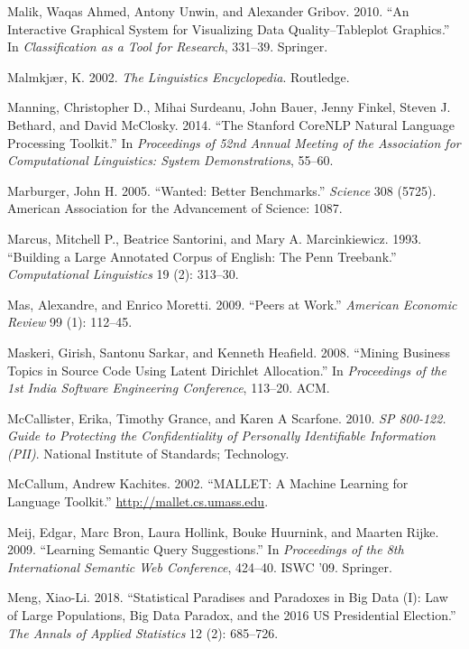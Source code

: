 \documentclass[]{krantz}
\begin{document}
\hypertarget{ref-malik2010interactive}{}
Malik, Waqas Ahmed, Antony Unwin, and Alexander Gribov. 2010. ``An
Interactive Graphical System for Visualizing Data Quality--Tableplot
Graphics.'' In \emph{Classification as a Tool for Research}, 331--39.
Springer.

\hypertarget{ref-malmkjar-02}{}
Malmkjær, K. 2002. \emph{The Linguistics Encyclopedia}. Routledge.

\hypertarget{ref-manning2014stanford}{}
Manning, Christopher D., Mihai Surdeanu, John Bauer, Jenny Finkel,
Steven J. Bethard, and David McClosky. 2014. ``The Stanford CoreNLP
Natural Language Processing Toolkit.'' In \emph{Proceedings of 52nd
Annual Meeting of the Association for Computational Linguistics: System
Demonstrations}, 55--60.

\hypertarget{ref-marburger2005wanted}{}
Marburger, John H. 2005. ``Wanted: Better Benchmarks.'' \emph{Science}
308 (5725). American Association for the Advancement of Science: 1087.

\hypertarget{ref-marcus-93}{}
Marcus, Mitchell P., Beatrice Santorini, and Mary A. Marcinkiewicz.
1993. ``Building a Large Annotated Corpus of English: The Penn
Treebank.'' \emph{Computational Linguistics} 19 (2): 313--30.

\hypertarget{ref-mas2009peers}{}
Mas, Alexandre, and Enrico Moretti. 2009. ``Peers at Work.''
\emph{American Economic Review} 99 (1): 112--45.

\hypertarget{ref-maskeri-08}{}
Maskeri, Girish, Santonu Sarkar, and Kenneth Heafield. 2008. ``Mining
Business Topics in Source Code Using Latent Dirichlet Allocation.'' In
\emph{Proceedings of the 1st India Software Engineering Conference},
113--20. ACM.

\hypertarget{ref-mccallister2010sp}{}
McCallister, Erika, Timothy Grance, and Karen A Scarfone. 2010. \emph{SP
800-122. Guide to Protecting the Confidentiality of Personally
Identifiable Information (PII)}. National Institute of Standards;
Technology.

\hypertarget{ref-mallet}{}
McCallum, Andrew Kachites. 2002. ``MALLET: A Machine Learning for
Language Toolkit.'' \url{http://mallet.cs.umass.edu}.

\hypertarget{ref-meij-09}{}
Meij, Edgar, Marc Bron, Laura Hollink, Bouke Huurnink, and Maarten
Rijke. 2009. ``Learning Semantic Query Suggestions.'' In
\emph{Proceedings of the 8th International Semantic Web Conference},
424--40. ISWC '09. Springer.

\hypertarget{ref-meng2018}{}
Meng, Xiao-Li. 2018. ``Statistical Paradises and Paradoxes in Big Data
(I): Law of Large Populations, Big Data Paradox, and the 2016 US
Presidential Election.'' \emph{The Annals of Applied Statistics} 12 (2):
685--726.
\end{document}
